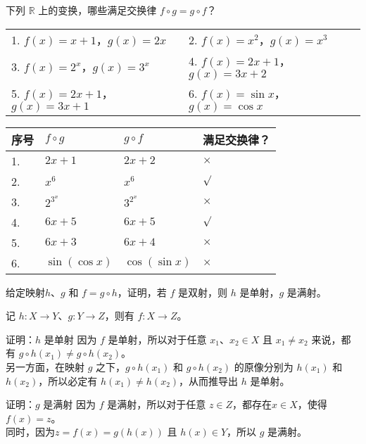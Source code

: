 	\begin{exercise}[0.3.4]
		下列 $\mathbb{R}$ 上的变换，哪些满足交换律 $f\circ g=g\circ f$？
		\begin{table}[htbp]
			\centering
			\begin{tabular}{p{0.5\textwidth}p{}}
				1. $f(x)=x+1$，$g(x)=2x$&2. $f(x)=x^{2}$，$g(x)=x^{3}$\\
				3. $f(x)=2^{x}$，$g(x)=3^{x}$&4. $f(x)=2x+1$，$g(x)=3x+2$\\
				5. $f(x)=2x+1$，$g(x)=3x+1$&6. $f(x)=\sin{x}$，$g(x)=\cos{x}$
			\end{tabular}
		\end{table}
	\end{exercise}
	\begin{solution}
		\begin{table}[htbp]
			\centering
			\begin{tabular}{p{}p{0.1\textwidth}p{}p{}}
				\toprule
				序号&$f\circ g$&$g\circ f$&满足交换律？\\
				\midrule
				1.&$2x+1$&$2x+2$&$\times$\\
				2.&$x^{6}$&$x^{6}$&$\surd$\\
				3.&$2^{3^{x}}$&$3^{2^{x}}$&$\times$\\
				4.&$6x+5$&$6x+5$&$\surd$\\
				5.&$6x+3$&$6x+4$&$\times$\\
				6.&$\sin(\cos{x})$&$\cos(\sin{x})$&$\times$\\
				\bottomrule
			\end{tabular}
		\end{table}
	\end{solution}
	
	\begin{exercise}[0.3.9]
		给定映射$h$、$g$ 和 $f=g\circ h$，证明，若 $f$ 是双射，则 $h$ 是单射，$g$ 是满射。
	\end{exercise}
	
	\begin{solution}
		记 $h : X\rightarrow Y$、$g : Y\rightarrow Z$，则有 $f : X\rightarrow Z$。
		
		\begin{step}{1}{证明：$h$ 是单射}
			因为 $f$ 是单射，所以对于任意 $x_1$、$x_2\in X$ 且 $x_1\neq x_2$ 来说，都有 $g\circ h(x_1) \neq g\circ h(x_2)$。\\另一方面，在映射 $g$ 之下，$g\circ h(x_1)$ 和 $g\circ h(x_2)$ 的原像分别为 $h(x_1)$ 和 $h(x_2)$，所以必定有 $h(x_1) \neq h(x_2)$，从而推导出 $h$ 是单射。
		\end{step}
		\begin{step}{2}{证明：$g$ 是满射}
			因为 $f$ 是满射，所以对于任意 $z\in Z$，都存在$x\in X$，使得$f(x)=z$。\\
			同时，因为$z=f(x)=g(h(x))$ 且 $h(x)\in Y$，所以 $g$ 是满射。
		\end{step}
	\end{solution}
	
